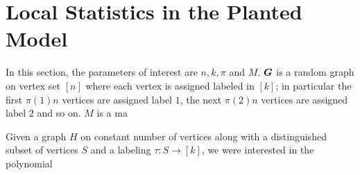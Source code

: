 \section{Local Statistics in the Planted Model}
In this section, the parameters of interest are $n,k,\pi$ and $M$.  $\boldsymbol{G}$ is a random graph on vertex set $[n]$ where each vertex is assigned labeled in $[k]$; in particular the first $\pi(1)n$ vertices are assigned label $1$, the next $\pi(2)n$ vertices are assigned label $2$ and so on.  $M$ is a ma


Given a graph $H$ on constant number of vertices along with a distinguished subset of vertices $S$ and a labeling $\tau:S\to[k]$, we were interested in the polynomial 
